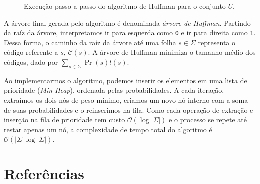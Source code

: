 \documentclass[a4paper, 12pt, english, brazilian]{article}
\begin{document}
\begin{figure}[H]
    \caption{Execução passo a passo do algoritmo de Huffman para o conjunto $U$.}
    \label{fig:huffman_steps}
\end{figure}

A árvore final gerada pelo algoritmo é denominada \textit{árvore de Huffman}. Partindo da raíz da árvore, interpretamos 
ir para esquerda como \texttt{0} e ir para direita como \texttt{1}. Dessa forma, o caminho da raíz da árvore até uma folha
$s \in \Sigma$ representa o código referente a $s$, $\mathcal{C}(s)$. A árvore de Huffman minimiza o tamanho médio dos
códigos, dado por $\sum_{s \in \Sigma}{\Pr(s)l(s)}$.

Ao implementarmos o algoritmo, podemos inserir os elementos em uma lista de prioridade (\textit{Min-Heap}), ordenada
pelas probabilidades. A cada iteração, extraímos os dois nós de peso mínimo, criamos um novo nó interno com a soma 
de suas probabilidades e o reinserimos na fila. Como cada operação de extração e inserção na fila de prioridade 
tem custo $\mathcal{O}(\log|\Sigma|)$ e o processo se repete até restar apenas um nó, a complexidade de tempo 
total do algoritmo é $\mathcal{O}(|\Sigma|\log|\Sigma|)$.

\section{Referências}
\end{document}
